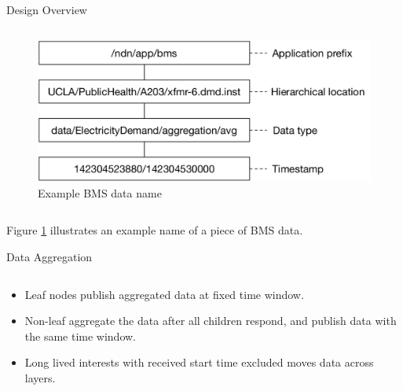 \documentclass[final,hyperref={pdfpagelabels=false},20pt]{beamer}
\begin{document}
\begin{frame}[t]
\begin{columns}[t]
\begin{column}{.465\textwidth}
\begin{block}{Design Overview}
\begin{columns}[T]
\begin{column}{.55\textwidth}
\begin{figure}
\includegraphics[width=\linewidth]{bms-example-name}
\caption{Example BMS data name}
\label{fig:example-name}
\end{figure}
\end{column}

\end{columns}

\vspace{15mm}

Figure \ref{fig:example-name} illustrates an example name of a piece of BMS data.

\end{block}


\begin{block}{Data Aggregation}

\begin{columns}[T]

\begin{column}{.42\textwidth}
\begin{itemize}
\item{Leaf nodes publish aggregated data at fixed time window.}
\item{Non-leaf aggregate the data after all children respond, and publish data with the same time window.}
\item{Long lived interests with received start time excluded moves data across layers.}
\end{itemize}
\end{column}


\end{columns}
\end{block}
\end{column}
\end{columns}
\end{frame}
\end{document}
